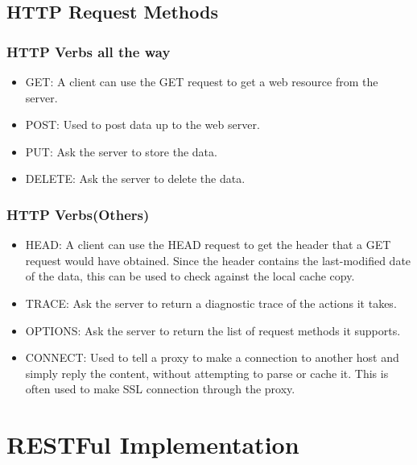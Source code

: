 \documentclass{beamer}
\begin{document}

\subsection{HTTP Request Methods}

\begin{frame}
\frametitle{HTTP Verbs all the way}
\begin{itemize}

\item GET: A client can use the GET request to get a web resource from the server.

\item POST: Used to post data up to the web server.
\item PUT: Ask the server to store the data.
\item DELETE: Ask the server to delete the data.
\end{itemize}
\end{frame}


\begin{frame}
\frametitle{HTTP Verbs(Others)}
\begin{itemize}


\item HEAD: A client can use the HEAD request to get the header that a GET request would have obtained. Since the header contains the last-modified date of the data, this can be used to check against the local cache copy.
\item TRACE: Ask the server to return a diagnostic trace of the actions it takes.
\item OPTIONS: Ask the server to return the list of request methods it supports.
\item CONNECT: Used to tell a proxy to make a connection to another host and simply reply the content, without attempting to parse or cache it. This is often used to make SSL connection through the proxy.
\end{itemize}
\end{frame}


\section{RESTFul Implementation }
\end{document}
